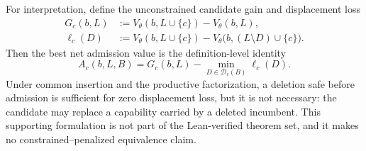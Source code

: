 For interpretation, define the unconstrained candidate gain and displacement
loss
\begin{align*}
 G_c(b,L)&:=V_\theta(b,L\cup\{c\})-V_\theta(b,L),\\
 \ell_c(D)&:=V_\theta(b,L\cup\{c\})
 -V_\theta\bigl(b,(L\setminus D)\cup\{c\}\bigr).
\end{align*}
Then the best net admission value is the definition-level identity
\[
 A_c(b,L,B)=G_c(b,L)-\min_{D\in\mathcal D_c(B)}\ell_c(D).
\]
Under common insertion and the productive factorization, a deletion safe
before admission is sufficient for zero displacement loss, but it is not
necessary: the candidate may replace a capability carried by a deleted
incumbent.  This supporting formulation is not part of the Lean-verified
theorem set, and it makes no constrained--penalized equivalence claim.
